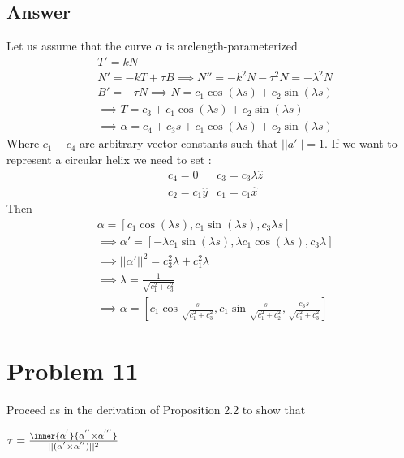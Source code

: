 \documentclass[
	12pt, %
]{fphw}
\theoremstyle{plain}
\begin{document}
\subsection*{Answer}
Let us assume that the curve $\alpha$ is arclength-parameterized
\begin{align*}
& T' = kN\\
& N' = -kT + \tau B \implies N'' = -k^{2}N - \tau^{2}N = -\lambda^{2}N\\
& B' = -\tau N \implies N = c_1 \cos(\lambda s) + c_2 \sin(\lambda s)\\
& \implies T = c_3 + c_1\cos(\lambda s) + c_2\sin(\lambda s)\\
& \implies \alpha = c_4 + c_3 s + c_1\cos(\lambda s) + c_2\sin(\lambda s)
\end{align*}
Where $c_1 - c_4$ are arbitrary vector constants such that $||a'||=1$.
If we want to represent a circular helix we need to set :
\begin{align*}
&c_4=0 &c_3 = c_3 \lambda \hat{z} \\
&c_2 = c_1\hat{y} & c_1 = c_1 \hat{x}
\end{align*}
Then 
\begin{align*}
&\alpha=[c_1\cos(\lambda s), c_1\sin(\lambda s), c_3\lambda s]\\
&\implies \alpha' = [-\lambda c_1\sin(\lambda s), \lambda c_1\cos(\lambda s), c_3\lambda]\\
&\implies ||\alpha'||^2 = c_{3}^2\lambda + c_{1}^2\lambda\\
&\implies \lambda = \frac{1}{\sqrt{c_{1}^2 + c_{3}^2}}\\
&\implies \alpha = [c_1\cos{\frac{s}{\sqrt{c_{1}^2 + c_{3}^2}}}, c_1\sin{\frac{s}{\sqrt{c_{1}^2 + c_{2}^2}}}, {\frac{c_3 s}{\sqrt{c_{1}^2 + c_{3}^2}}}]
\end{align*}

\section*{Problem 11}
\begin{problem}
     Proceed as in the derivation of Proposition 2.2 to show that\\
     \begin{center}
          $\tau = \frac{\inner{\alpha^{'}}{\alpha^{''} \times \alpha^{'''}}}{||(\alpha^{'} \times \alpha^{''})||^{2}}$
     \end{center}
\end{problem}
\end{document}
